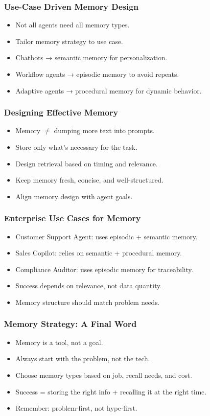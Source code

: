 \begin{frame}[fragile]\frametitle{Use-Case Driven Memory Design}
\begin{itemize}
  \item Not all agents need all memory types.
  \item Tailor memory strategy to use case.
  \item Chatbots → semantic memory for personalization.
  \item Workflow agents → episodic memory to avoid repeats.
  \item Adaptive agents → procedural memory for dynamic behavior.
\end{itemize}
\end{frame}

\begin{frame}[fragile]\frametitle{Designing Effective Memory}
\begin{itemize}
  \item Memory $\neq$ dumping more text into prompts.
  \item Store only what’s necessary for the task.
  \item Design retrieval based on timing and relevance.
  \item Keep memory fresh, concise, and well-structured.
  \item Align memory design with agent goals.
\end{itemize}
\end{frame}

\begin{frame}[fragile]\frametitle{Enterprise Use Cases for Memory}
\begin{itemize}
  \item Customer Support Agent: uses episodic + semantic memory.
  \item Sales Copilot: relies on semantic + procedural memory.
  \item Compliance Auditor: uses episodic memory for traceability.
  \item Success depends on relevance, not data quantity.
  \item Memory structure should match problem needs.
\end{itemize}
\end{frame}

\begin{frame}[fragile]\frametitle{Memory Strategy: A Final Word}
\begin{itemize}
  \item Memory is a tool, not a goal.
  \item Always start with the problem, not the tech.
  \item Choose memory types based on job, recall needs, and cost.
  \item Success = storing the right info + recalling it at the right time.
  \item Remember: problem-first, not hype-first.
\end{itemize}
\end{frame}

